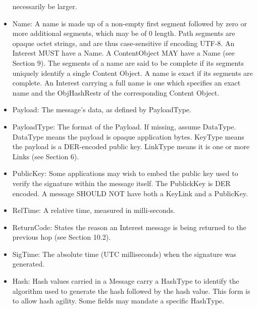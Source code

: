 \documentclass[12pt]{article}
\begin{document}
\begin{itemize}
   necessarily be larger.
\item Name: A name is made up of a non-empty first segment followed by
    zero or more additional segments, which may be of 0 length.  Path
    segments are opaque octet strings, and are thus case-sensitive if
    encoding UTF-8.  An Interest MUST have a Name.  A ContentObject
    MAY have a Name (see Section 9).  The segments of a name are said
    to be complete if its segments uniquely identify a single Content
    Object.  A name is exact if its segments are complete.  An
    Interest carrying a full name is one which specifies an exact name
    and the ObjHashRestr of the corresponding Content Object.
\item Payload: The message's data, as defined by PayloadType.
\item PayloadType: The format of the Payload.  If missing, assume
   DataType.  DataType means the payload is opaque application bytes.
   KeyType means the payload is a DER-encoded public key.  LinkType
   means it is one or more Links (see Section 6).
\item PublicKey: Some applications may wish to embed the public key used
   to verify the signature within the message itself.  The PublickKey
   is DER encoded.  A message SHOULD NOT have both a KeyLink and a
   PublicKey.
\item RelTime: A relative time, measured in milli-seconds.
\item ReturnCode: States the reason an Interest message is being
   returned to the previous hop (see Section 10.2).
\item SigTime: The absolute time (UTC milliseconds) when the signature
   was generated.
\item Hash: Hash values carried in a Message carry a HashType to
   identify the algorithm used to generate the hash followed by the
   hash value.  This form is to allow hash agility.  Some fields may
   mandate a specific HashType.
\end{itemize}
\end{document}
